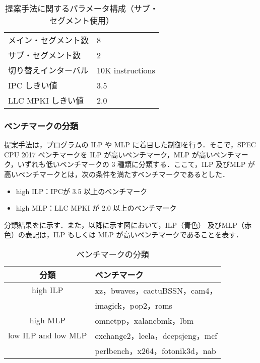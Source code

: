 \begin{table}[tb]
  \caption{提案手法に関するパラメータ構成（サブ・セグメント使用）}
  \footnotesize
  \center
    \begin{tabular}{l|l} \hline \hline
    メイン・セグメント数 & 8 \\
    サブ・セグメント数 & 2 \\
    切り替えインターバル & 10K instructions \\
    IPC しきい値 & 3.5 \\
    LLC MPKI しきい値 & 2.0 \\ \hline 
  \end{tabular}
  \label{tab:switch_config_subseg}
\end{table}

\subsubsection{ベンチマークの分類}
提案手法は，プログラムの ILP や MLP に着目した制御を行う．そこで，SPEC CPU 2017 ベンチマークを ILP が高いベンチマーク，MLP が高いベンチマーク，いずれも低いベンチマークの 3 種類に分類する．ここて，ILP 及びMLP が高いベンチマークとは，次の条件を満たすベンチマークであるとした．
\begin{itemize}
  \item high ILP：IPCが 3.5 以上のベンチマーク
  \item high MLP：LLC MPKI が 2.0 以上のベンチマーク
\end{itemize}

分類結果をに示す．また，以降に示す図において，ILP（青色） 及びMLP（赤色）の表記は，ILP もしくは MLP が高いベンチマークであることを表す．
\begin{table}[htb]
  \caption{ベンチマークの分類}
  \footnotesize
  \center
    \begin{tabular}{c|l} \hline \hline
    分類 & ベンチマーク\\ \hline
    high ILP & xz，bwaves，cactuBSSN，cam4，\\
             & imagick，pop2，roms\\ \hline
    high MLP &  omnetpp，xalancbmk，lbm\\ \hline
    low ILP and low MLP & exchange2，leela，deepsjeng，mcf\\
                        & perlbench，x264，fotonik3d，nab \\ \hline
  \end{tabular}
  \label{tab:classification}
\end{table}

